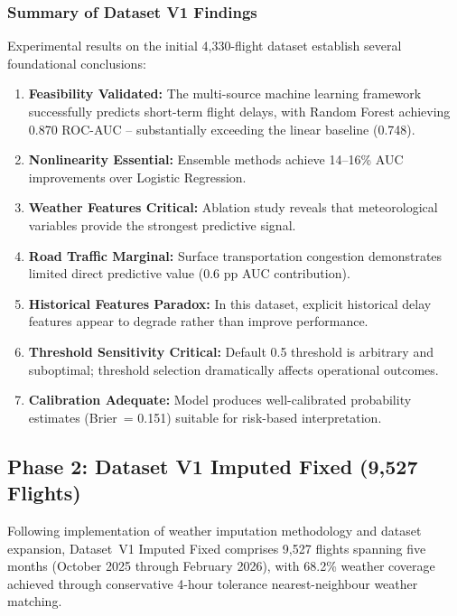 \documentclass{report}
\begin{document}
\subsubsection*{Summary of Dataset V1 Findings}

Experimental results on the initial 4,330-flight dataset establish several
foundational conclusions:

\begin{enumerate}
\item \textbf{Feasibility Validated:} The multi-source machine learning
  framework successfully predicts short-term flight delays, with Random
  Forest achieving 0.870 ROC-AUC -- substantially exceeding the linear
  baseline (0.748).
\item \textbf{Nonlinearity Essential:} Ensemble methods achieve 14--16\%
  AUC improvements over Logistic Regression.
\item \textbf{Weather Features Critical:} Ablation study reveals that
  meteorological variables provide the strongest predictive signal.
\item \textbf{Road Traffic Marginal:} Surface transportation congestion
  demonstrates limited direct predictive value (0.6 pp AUC contribution).
\item \textbf{Historical Features Paradox:} In this dataset, explicit
  historical delay features appear to degrade rather than improve performance.
\item \textbf{Threshold Sensitivity Critical:} Default 0.5 threshold is
  arbitrary and suboptimal; threshold selection dramatically affects
  operational outcomes.
\item \textbf{Calibration Adequate:} Model produces well-calibrated
  probability estimates (Brier~= 0.151) suitable for risk-based
  interpretation.
\end{enumerate}

\subsection{Phase 2: Dataset V1 Imputed Fixed (9,527 Flights)}

Following implementation of weather imputation methodology and dataset
expansion, Dataset~V1 Imputed Fixed comprises 9,527 flights spanning five
months (October 2025 through February 2026), with 68.2\% weather coverage
achieved through conservative 4-hour tolerance nearest-neighbour weather
matching.
\end{document}
